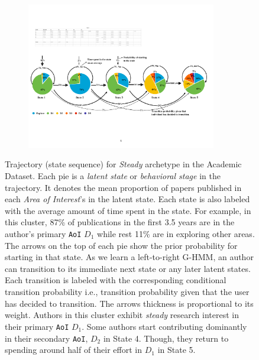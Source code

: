 \begin{figure}[tbh]
	\centering
	\begin{subfigure}{\textwidth}
		\centering
		\includegraphics[width=1\linewidth,height=6.4cm]{figures/Cluster4_Self.pdf}
	\end{subfigure}
	\caption{%
	\label{fig:acadclusters} Trajectory (state sequence) for \emph{Steady} archetype in the Academic Dataset. Each pie is a \emph{latent state} or \emph{behavioral stage} in the trajectory. It denotes the mean proportion of papers published in each \emph{Area of Interest}'s in the latent state. Each state is also labeled with the average amount of time spent in the state. For example, in this cluster, 87\% of publications in the first 3.5 years are in the author's primary \texttt{AoI} $D_1$ while rest 11\% are in exploring other areas. The arrows on the top of each pie show the prior probability for starting in that state. As we learn a left-to-right G-HMM, an author can transition to its immediate next state or any later latent states. Each transition is labeled with the corresponding conditional transition probability i.e., transition probability given that the user has decided to transition. The arrows thickness is proportional to its weight. Authors in this cluster exhibit \emph{steady} research interest in their primary \texttt{AoI} $D_1$. Some authors start contributing dominantly in their secondary \texttt{AoI}, $D_2$ in State 4. Though, they return to spending around half of their effort in $D_1$ in State 5.
	}
	\label{fig:academic}
\end{figure}

